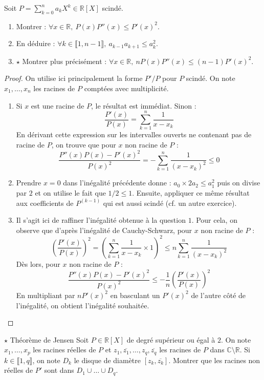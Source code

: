 \documentclass[french,a4paper]{article}
\newcommand{\R}{\mathbb{R}}
\newcommand{\C}{\mathbb{C}}
\theoremstyle{plain}
\theoremstyle{definition}
\theoremstyle{remark}
\begin{document}
\begin{ex}{}
	Soit $P=\displaystyle\sum_{k=0}^{n}a_kX^k\in\R[X]$ scindé.
	\begin{enumerate}
		\item Montrer : $\forall x\in\R,\ P(x)P''(x)\leqslant P'(x)^2$.
		\item En déduire : $\forall k\in\llbracket1,n-1\rrbracket,\ a_{k-1}a_{k+1}\leqslant a_k^2$.
		\item $\star$ Montrer plus précisément : $\forall x\in\R,\ nP(x)P''(x)\leqslant(n-1)P'(x)^2$.
	\end{enumerate}
\end{ex}
\begin{proof}
	On utilise ici principalement la forme $P'/P$ pour $P$ scindé. On note $x_1,\ldots,x_n$ les racines de $P$ comptées avec multiplicité.
	\begin{enumerate}
		\item Si $x$ est une racine de $P$, le résultat est immédiat. Sinon : $$\frac{P'(x)}{P(x)}=\sum_{k=1}^{n}\frac{1}{x-x_k}$$ En dérivant cette expression sur les intervalles ouverts ne contenant pas de racine de $P$, on trouve que pour $x$ non racine de $P$ : $$\frac{P''(x)P(x)-P'(x)^2}{P(x)^2}=-\sum_{k=1}^{n}\frac{1}{(x-x_k)^2}\leqslant 0$$
		\item Prendre $x=0$ dans l'inégalité précédente donne : $a_0\times 2a_2\leqslant a_1^2$ puis on divise par $2$ et on utilise le fait que $1/2\leqslant 1$. Ensuite, appliquer ce même résultat aux coefficients de $P^{(k-1)}$ qui est aussi scindé (cf. un autre exercice).
		\item Il s'agit ici de raffiner l'inégalité obtenue à la question $1$. Pour cela, on observe que d'après l'inégalité de Cauchy-Schwarz, pour $x$ non racine de $P$ : $$\left(\frac{P'(x)}{P(x)}\right)^2=\left(\sum_{k=1}^{n}\frac{1}{x-x_k}\times 1\right)^2\leqslant n\sum_{k=1}^{n}\frac{1}{(x-x_k)^2}$$ Dès lors, pour $x$ non racine de $P$ : $$\frac{P''(x)P(x)-P'(x)^2}{P(x)^2}\leqslant-\frac{1}{n}\left(\frac{P'(x)}{P(x)}\right)^2$$ En multipliant par $nP'(x)^2$ en basculant un $P'(x)^2$ de l'autre côté de l'inégalité, on obtient l'inégalité souhaitée.
	\end{enumerate}
\end{proof}

\begin{ex}{$\star$ Théorème de Jensen}
	Soit $P\in\R[X]$ de degré supérieur ou égal à $2$. On note $x_1,\ldots,x_p$ les racines réelles de $P$ et $z_1,\overline{z_1},\ldots,z_q,\overline{z_q}$ les racines de $P$ dans $\C\setminus\R$. Si $k\in\llbracket 1,q\rrbracket$, on note $D_k$ le disque de diamètre $[z_k,\overline{z_k}]$. Montrer que les racines non réelles de $P'$ sont dans $D_1\cup\ldots\cup D_q$.
\end{ex}
\end{document}
